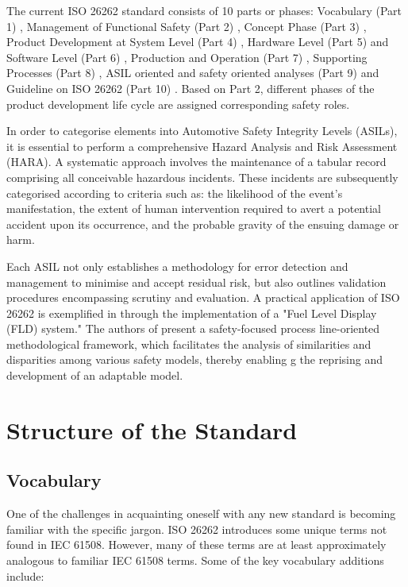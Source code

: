 \documentclass[./dissertation.tex]{subfiles}
\begin{document}
The current ISO 26262 standard consists of 10 parts or phases: Vocabulary (Part 1) \cite{iso26262-1}, Management of Functional Safety (Part 2) \cite{iso26262-2}, Concept Phase (Part 3) \cite{iso26262-3}, Product Development at System Level (Part 4) \cite{iso26262-4}, Hardware Level (Part 5) \cite{iso26262-5} and Software Level (Part 6) \cite{iso26262-6}, Production and Operation (Part 7) \cite{iso26262-7}, Supporting Processes (Part 8) \cite{iso26262-8}, ASIL oriented and safety oriented analyses (Part 9) \cite{iso26262-9} and Guideline on ISO 26262 (Part 10) \cite{iso26262-10}. Based on Part 2, different phases of the product development life cycle are assigned corresponding safety roles.

In order to categorise elements into Automotive Safety Integrity Levels (ASILs), it is essential to perform a comprehensive Hazard Analysis and Risk Assessment (HARA). A systematic approach involves the maintenance of a tabular record comprising all conceivable hazardous incidents. These incidents are subsequently categorised according to criteria such as: the likelihood of the event's manifestation, the extent of human intervention required to avert a potential accident upon its occurrence, and the probable gravity of the ensuing damage or harm.

Each ASIL not only establishes a methodology for error detection and management to minimise and accept residual risk, but also outlines validation procedures encompassing scrutiny and evaluation. A practical application of ISO 26262 is exemplified in \cite{westman2013reference} through the implementation of a "Fuel Level Display (FLD) system." The authors of \cite{6903180} present a safety-focused process line-oriented methodological framework, which facilitates the analysis of similarities and disparities among various safety models, thereby enabling  g the reprising and development of an adaptable model.

\section{Structure of the Standard}
\subsection{Vocabulary}

One of the challenges in acquainting oneself with any new standard is becoming familiar with the specific jargon. ISO 26262 introduces some unique terms not found in IEC 61508. However, many of these terms are at least approximately analogous to familiar IEC 61508 terms. Some of the key vocabulary additions include:
\end{document}
